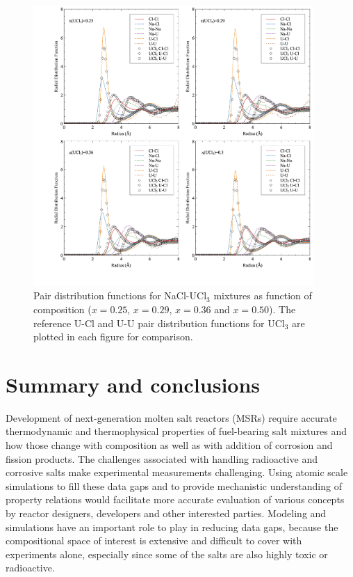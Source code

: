 \documentclass[preprint,3p,10pt,onecolumn,number,sort&compress]{elsarticle}
\begin{document}
{ \begin{figure}[htb]
\centering
\includegraphics[width=0.95\textwidth]{fig14.jpg}
\caption{Pair distribution functions for NaCl-UCl$_3$ mixtures as function of composition ($x=0.25$, $x=0.29$, $x=0.36$ and $x=0.50$). The reference U-Cl and U-U pair distribution functions for UCl$_3$ are plotted in each figure for comparison.} 
\label{fig:fig_pair}
\end{figure}

\FloatBarrier

\section{Summary and conclusions}
\label{sec:conclusions}
Development of next-generation molten salt reactors (MSRs) require accurate thermodynamic and thermophysical properties of fuel-bearing salt mixtures and how those change with composition as well as with addition of corrosion and fission products. The challenges associated with handling radioactive and corrosive salts make experimental measurements challenging. Using atomic scale simulations to fill these data gaps and to provide mechanistic understanding of property relations would facilitate more accurate evaluation of various concepts by reactor designers, developers and other interested parties. Modeling and simulations have an important role to play in reducing data gaps, because the compositional space of interest is extensive and difficult to cover with experiments alone, especially since some of the salts are also highly toxic or radioactive. 

}
\end{document}
